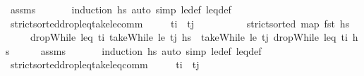 \begin{isabellebody}
\ assms\ \isanewline
\ \ \ \ \isamarkupfalse%
\ {\isacharparenleft}{\kern0pt}induction\ hs{\isacharparenright}{\kern0pt}\ {\isacharparenleft}{\kern0pt}auto\ simp{\isacharcolon}{\kern0pt}\ le{\isacharunderscore}{\kern0pt}def\ leq{\isacharunderscore}{\kern0pt}def{\isacharparenright}{\kern0pt}%
\endisatagproof
{\isafoldproof}%
%
\isadelimproof
\isanewline
%
\endisadelimproof
\isanewline
\ \ \isamarkupfalse%
\ strict{\isacharunderscore}{\kern0pt}sorted{\isacharunderscore}{\kern0pt}drop{\isacharunderscore}{\kern0pt}leq{\isacharunderscore}{\kern0pt}take{\isacharunderscore}{\kern0pt}le{\isacharunderscore}{\kern0pt}comm{\isacharcolon}{\kern0pt}\isanewline
\ \ \ \ \ {\isachardoublequoteopen}t\isactrlsub i\ {\isacharless}{\kern0pt}\ t\isactrlsub j{\isachardoublequoteclose}\ \isanewline
\ \ \ \ \ \ \ \ \ {\isachardoublequoteopen}strict{\isacharunderscore}{\kern0pt}sorted\ {\isacharparenleft}{\kern0pt}map\ fst\ hs{\isacharparenright}{\kern0pt}{\isachardoublequoteclose}\isanewline
\ \ \ \ \ {\isachardoublequoteopen}dropWhile\ {\isacharparenleft}{\kern0pt}leq\ t\isactrlsub i{\isacharparenright}{\kern0pt}\ {\isacharparenleft}{\kern0pt}takeWhile\ {\isacharparenleft}{\kern0pt}le\ t\isactrlsub j{\isacharparenright}{\kern0pt}\ hs{\isacharparenright}{\kern0pt}\ {\isacharequal}{\kern0pt}\ takeWhile\ {\isacharparenleft}{\kern0pt}le\ t\isactrlsub j{\isacharparenright}{\kern0pt}\ {\isacharparenleft}{\kern0pt}dropWhile\ {\isacharparenleft}{\kern0pt}leq\ t\isactrlsub i{\isacharparenright}{\kern0pt}\ hs{\isacharparenright}{\kern0pt}{\isachardoublequoteclose}\isanewline
%
\isadelimproof
\ \ \ \ %
\endisadelimproof
%
\isatagproof
{}\isamarkupfalse%
\ assms\ \isanewline
\ \ \ \ \isamarkupfalse%
\ {\isacharparenleft}{\kern0pt}induction\ hs{\isacharparenright}{\kern0pt}\ {\isacharparenleft}{\kern0pt}auto\ simp{\isacharcolon}{\kern0pt}\ le{\isacharunderscore}{\kern0pt}def\ leq{\isacharunderscore}{\kern0pt}def{\isacharparenright}{\kern0pt}%
\endisatagproof
{\isafoldproof}%
%
\isadelimproof
\isanewline
%
\endisadelimproof
\isanewline
\ \ \isamarkupfalse%
\ strict{\isacharunderscore}{\kern0pt}sorted{\isacharunderscore}{\kern0pt}drop{\isacharunderscore}{\kern0pt}leq{\isacharunderscore}{\kern0pt}take{\isacharunderscore}{\kern0pt}leq{\isacharunderscore}{\kern0pt}comm{\isacharcolon}{\kern0pt}\isanewline
\ \ \ \ \ {\isachardoublequoteopen}t\isactrlsub i\ {\isasymle}\ t\isactrlsub j{\isachardoublequoteclose}\ \isanewline

\end{isabellebody}
